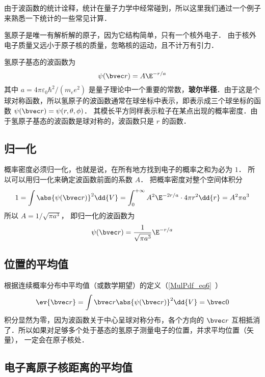 

由于波函数的统计诠释，统计在量子力学中经常碰到，所以这里我们通过一个例子来熟悉一下统计的一些常见计算．

氢原子是唯一有解析解的原子，因为它结构简单，只有一个核外电子． 由于核外电子质量又远小于原子核的质量，忽略核的运动，且不计万有引力．

氢原子基态的波函数为
\begin{equation}
\psi(\bvec r) = A\E^{-r/a}
\end{equation}
其中 $a = 4\pi\varepsilon_0 \hbar ^2/(m_e e^2)$ 是量子理论中一个重要的常数，\textbf{玻尔半径}．由于这是个球对称函数，所以氢原子的波函数通常在球坐标中表示，即表示成三个球坐标的函数 $\psi (\bvec r) = \psi (r, \theta, \phi)$． 其模长平方同样表示粒子在某点出现的概率密度．由于氢原子基态的波函数是球对称的，波函数只是 $r$ 的函数．

\subsection{归一化}
  
概率密度必须归一化，也就是说，在所有地方找到电子的概率之和为必为 $1$． 所以可以用归一化来确定波函数前面的系数 $A$． 把概率密度对整个空间体积分
\begin{equation}
1 = \int \abs{\psi(\bvec r)} ^2 \dd{V}  = \int_0^{+\infty} A^2 \E^{-2r/a} \cdot 4\pi r^2\dd{r} = A^2 \pi a^3
\end{equation}
所以 $A = 1/\sqrt{\pi a^3}$， 即归一化的波函数为
\begin{equation}
\psi (\bvec r) = \frac{1}{\sqrt{\pi a^3}} \E^{-r/a}
\end{equation}

\subsection{位置的平均值}

 根据连续概率分布中平均值（或数学期望）的定义（\autoref{MulPdf_eq6}~）
\begin{equation}
\ev{\bvec r} = \int \bvec r \abs{\psi (\bvec r)} ^2 \dd{V} =  \bvec 0
\end{equation}
积分显然为零，因为波函数关于中心呈球对称分布，各个方向的 $\bvec r$ 互相抵消了．所以如果对足够多个处于基态的氢原子测量电子的位置，并求平均位置（矢量）， 一定会在原子核处．

\subsection{电子离原子核距离的平均值}

